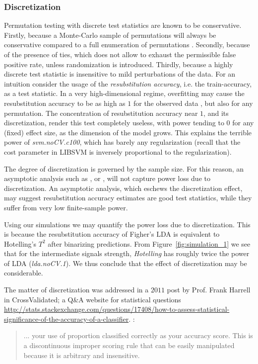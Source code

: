 \documentclass[oupdraft]{bio}
\begin{document}
\subsubsection{Discretization}
Permutation testing with discrete test statistics are known to be conservative.
Firstly, because a Monte-Carlo sample of permutations will always be conservative compared to a full enumeration of permutations \citep{hemerik_exact_2014}.
Secondly, because of the presence of ties, which does not allow to exhaust the permissible false positive rate, unless randomization is introduced.
Thirdly, because a highly discrete test statistic is insensitive to mild perturbations of the data.
For an intuition consider the usage of the \emph{resubstitution accuracy}, i.e. the train-accuracy, as a test statistic. 
In a very high-dimensional regime, overfitting may cause the resubstitution accuracy to be as high as $1$ for the observed data \cite[Theorem 1]{mclachlan_bias_1976}, but also for any permutation.
The concentration of resubstitution accuracy near $1$, and its discretization, render this test completely useless, with power tending to $0$ for any (fixed) effect size, as the dimension of the model grows. 
This explains the terrible power of \emph{svm.noCV.c100}, which has barely any regularization (recall that the cost parameter in LIBSVM is inversely proportional to the regularization). 

The degree of discretization is governed by the sample size. 
For this reason, an asymptotic analysis such as \cite{ramdas_classification_2016}, or \cite{golland_permutation_2005}, will not capture power loss due to discretization. 
An asymptotic analysis, which eschews the discretization effect,  may suggest resubstitution accuracy estimates are good test statistics, while they suffer from very low finite-sample power. 

Using our simulations we may quantify the power loss due to discretization.
This is because the resubstitution accuracy of Figher's LDA is equivalent to Hotelling's $T^2$ after binarizing predictions. 
From Figure~\ref{fig:simulation_1} we see that for the intermediate signals strength, \emph{Hotelling} has roughly twice the power of LDA (\emph{lda.noCV.1}).
We thus conclude that the effect of discretization may be considerable. 


The matter of discretization was addressed in a $2011$ post by Prof. Frank Harrell in \textsf{CrossValidated}; a Q\&A website for statistical questions \url{http://stats.stackexchange.com/questions/17408/how-to-assess-statistical-significance-of-the-accuracy-of-a-classifier}. :
\begin{quote}
	... your use of proportion classified correctly as your accuracy score. This is a discontinuous improper scoring rule that can be easily manipulated because it is arbitrary and insensitive.
\end{quote}
\end{document}

